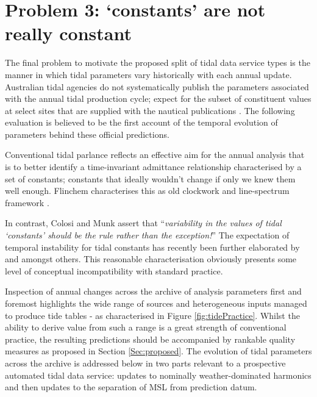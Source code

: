 \section{Problem 3: `constants' are not really constant}
\label{Sec:Evolution}
The final problem to motivate the proposed split of tidal data service types is the manner in which tidal parameters vary historically with each annual update.
Australian tidal agencies do not systematically publish the parameters associated with the annual tidal production cycle; expect for the subset of constituent values at select sites that are supplied with the nautical publications \cite{austides}.  The following evaluation is believed to be the first account of the temporal evolution of parameters behind these official predictions.  

Conventional tidal parlance reflects an effective aim for the annual analysis that is to better identify a time-invariant admittance relationship characterised by a set of constants; constants that ideally wouldn't change if only we knew them well enough. Flinchem characterises this as old clockwork and  line-spectrum framework \cite{Flinchem:2000kp}. 

In contrast, Colosi and Munk assert that ``\textit{variability in the values of tidal `constants' should be the rule rather than the exception!}'' \cite{Colosi:2006va}
The expectation of temporal instability for tidal constants has recently been further elaborated by  \citeauthor{10.1029/2018rg000636} and \citeauthor{10.1002/2017jc013165} amongst others.    This reasonable characterisation obviously presents some level of conceptual incompatibility with standard practice.

Inspection of annual changes across the archive of analysis parameters first and foremost highlights the wide range of sources and heterogeneous inputs managed to produce tide tables - as characterised in Figure \ref{fig:tidePractice}.    Whilst the ability to derive value from such a range is a great strength of conventional practice, the resulting predictions  should be accompanied by rankable quality measures as proposed in Section \ref{Sec:proposed}.
The evolution of tidal parameters across the archive is addressed below in two parts relevant to a prospective automated tidal data service:  updates to nominally weather-dominated harmonics and then updates to the separation of MSL from prediction datum.

